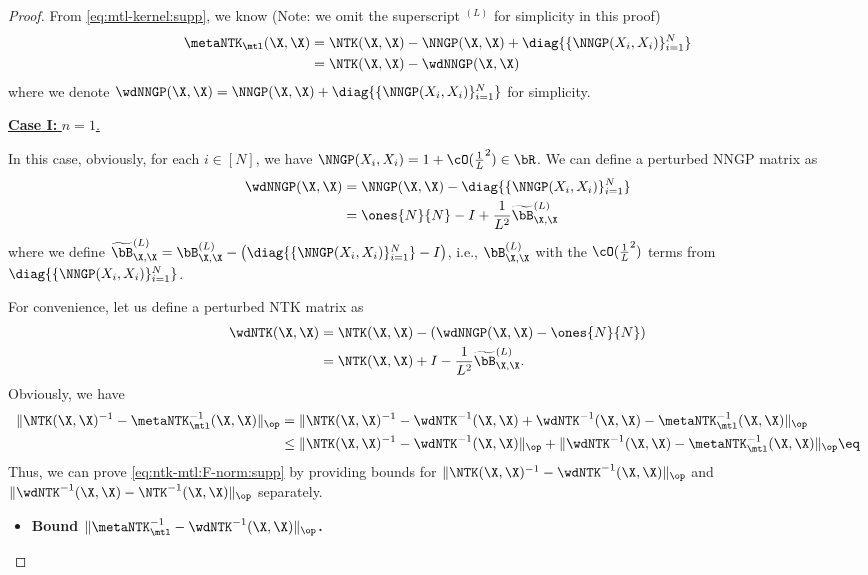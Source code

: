 \documentclass{article}
\begin{document}
\begin{proof}
From \eqref{eq:mtl-kernel:supp}, we know (Note: we omit the superscript $^{(L)}$ for simplicity in this proof)
\begin{align*}
    \metaNTK_\mtl(\X,\X) & = \NTK(\X,\X) - \NNGP(\X,\X) + \diag{\{\NNGP(X_i,X_i)\}_{i=1}^N} \\
    & = \NTK(\X,\X) - \wdNNGP(\X,\X)
\end{align*}
where we denote $\wdNNGP (\X,\X) = \NNGP (\X,\X) + \diag{\{\NNGP(X_i,X_i)\}_{i=1}^N}$ for simplicity. 


\underline{\textbf{Case I:} $n=1$.}


In this case, obviously, for each $i\in[N]$, we have $\NNGP(X_i,X_i) = 1 + \cO(\frac 1 L^2) \in \bR$. We can define a perturbed NNGP matrix as
\begin{align}\label{eq:perturbed-nngp}
    \wdNNGP(\X,\X) &= \NNGP(\X,\X) - \diag{\{\NNGP(X_i,X_i)\}_{i=1}^N}\\
     & = \ones{N}{N} - I + \frac{1}{L^2}  \widetilde{\bB}^{(L)}_{\X,\X} 
\end{align}
where we define $\widetilde{\bB}^{(L)}_{\X,\X}  = \bB^{(L)}_{\X,\X} - \left(\diag{\{\NNGP(X_i,X_i)\}_{i=1}^N} - I\right)$, i.e., $\bB^{(L)}_{\X,\X}$ with the $\cO(\frac 1 L^2)$ terms from $\diag{\{\NNGP(X_i,X_i)\}_{i=1}^N}$.

For convenience, let us define a perturbed NTK matrix as 
\begin{align}\label{eq:perturbed-ntk}
    \wdNTK(\X,\X) &= \NTK(\X,\X) - \left(\wdNNGP(\X,\X) - \ones{N}{N}\right)\nonumber\\
    &=\NTK(\X,\X) + I - \frac{1}{L^2}  \widetilde{\bB}^{(L)}_{\X,\X}.
\end{align}
Obviously, we have
\begin{align*}
    \|\NTK(\X,\X)^{-1} - \metaNTK_\mtl^{-1}(\X,\X)\|_{\op} &= \|\NTK(\X,\X)^{-1} - \wdNTK^{-1}(\X,\X) + \wdNTK^{-1}(\X,\X) - \metaNTK_\mtl^{-1}(\X,\X)\|_{\op}\\
    &\leq \|\NTK(\X,\X)^{-1} - \wdNTK^{-1}(\X,\X)\|_{\op} + \|\wdNTK^{-1}(\X,\X) - \metaNTK_\mtl^{-1}(\X,\X)\|_{\op}\eq\label{eq:ntk-mtl-inv:norm:bound}
\end{align*}
Thus, we can prove \eqref{eq:ntk-mtl:F-norm:supp} by providing bounds for $\|\NTK(\X,\X)^{-1} - \wdNTK^{-1}(\X,\X)\|_{\op}$ and $\|\wdNTK^{-1}(\X,\X) - \NTK^{-1}(\X,\X)\|_{\op}$ separately.
\begin{itemize}
    \item \textbf{Bound $\|\metaNTK_\mtl^{-1} - \wdNTK^{-1}(\X,\X)\|_{\op}$.}



\end{itemize}
\end{proof}
\end{document}
